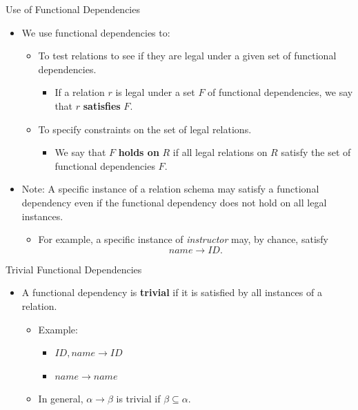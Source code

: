 \documentclass{beamer}
\begin{document}
\begin{frame}{Use of Functional Dependencies}
    \begin{itemize}
        \item We use functional dependencies to:
        \begin{itemize}
            \item To test relations to see if they are legal under a given set of functional dependencies.
            \begin{itemize}
                \item If a relation $r$ is legal under a set $F$ of functional dependencies, we say that $r$ \textbf{satisfies} $F$.
            \end{itemize}
            \item To specify constraints on the set of legal relations.
            \begin{itemize}
                \item We say that $F$ \textbf{holds on} $R$ if all legal relations on $R$ satisfy the set of functional dependencies $F$.
            \end{itemize}
        \end{itemize}
        \item Note: A specific instance of a relation schema may satisfy a functional dependency even if the functional dependency does not hold on all legal instances.
        \begin{itemize}
            \item For example, a specific instance of \textit{instructor} may, by chance, satisfy
            $$
                name \rightarrow ID.
            $$
        \end{itemize}
    \end{itemize}
\end{frame}

\begin{frame}{Trivial Functional Dependencies}
    \begin{itemize}
        \item A functional dependency is \textbf{trivial} if it is satisfied by all instances of a relation.
        \begin{itemize}
            \item Example:
            \begin{itemize}
                \item $ID, name \rightarrow ID$
                \item $name \rightarrow name$
            \end{itemize}
            \item In general, $\alpha \rightarrow \beta$ is trivial if $\beta \subseteq \alpha$.
        \end{itemize}
    \end{itemize}
\end{frame}
\end{document}
